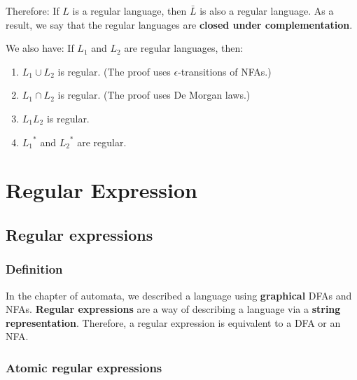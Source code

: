 \documentclass[12pt, letterpaper, oneside]{book}
\begin{document}
Therefore: If $L$ is a regular language, then $\bar{L}$ is also a regular language. As a result, we say that the
regular languages are \textbf{closed under complementation}.

We also have: If $L_1$ and $L_2$ are regular languages, then:
\begin{enumerate}
  \item $L_1 \cup L_2$ is regular. (The proof uses $\epsilon$-transitions of NFAs.)
  \item $L_1 \cap L_2$ is regular. (The proof uses De Morgan laws.)
  \item $L_1L_2$ is regular.
  \item ${L_1}^*$ and ${L_2}^*$ are regular.
\end{enumerate}

%
%

\chapter{Regular Expression}

\section{Regular expressions}

\subsection{Definition}

In the chapter of automata, we described a language using \textbf{graphical} DFAs and NFAs. \textbf{Regular expressions}
are a way of describing a language via a \textbf{string representation}. Therefore, a regular expression is equivalent
to a DFA or an NFA.

\subsection{Atomic regular expressions}
\end{document}
